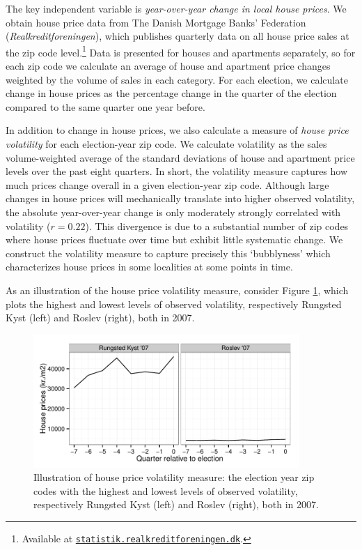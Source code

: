 \documentclass[12pt,a4paper]{article}
\begin{document}
The key independent variable is \textit{year-over-year change in local house prices}. We obtain house price data from The Danish Mortgage Banks' Federation (\textit{Realkreditforeningen}), which publishes quarterly data on all house price sales at the zip code level.\footnote{Available at \texttt{\href{http://statistik.realkreditforeningen.dk/}{statistik.realkreditforeningen.dk}}.} Data is presented for houses and apartments separately, so for each zip code we calculate an average of house and apartment price changes weighted by the volume of sales in each category. For each election, we calculate change in house prices as the percentage change in the quarter of the election compared to the same quarter one year before.

In addition to change in house prices, we also calculate a measure of \textit{house price volatility} for each election-year zip code. We calculate volatility as the sales volume-weighted average of the standard deviations of house and apartment price levels over the past eight quarters. In short, the volatility measure captures how much prices change overall in a given election-year zip code. Although large changes in house prices will mechanically translate into higher observed volatility, the absolute year-over-year change is only moderately strongly correlated with volatility ($r=0.22$). This divergence is due to a substantial number of zip codes where house prices fluctuate over time but exhibit little systematic change. We construct the volatility measure to capture precisely this `bubblyness' which characterizes house prices in some localities at some points in time.

As an illustration of the house price volatility measure, consider Figure \ref{volcases}, which plots the highest and lowest levels of observed volatility, respectively Rungsted Kyst (left) and Roslev (right), both in 2007.

\begin{figure}[htbp!]
	\includegraphics[width=0.9\textwidth]{../figures/volcases}
	\centering
	\caption{Illustration of house price volatility measure: the election year zip codes with the highest and lowest levels of observed volatility, respectively Rungsted Kyst (left) and Roslev (right), both in 2007.}\label{volcases}
\end{figure}
\end{document}
